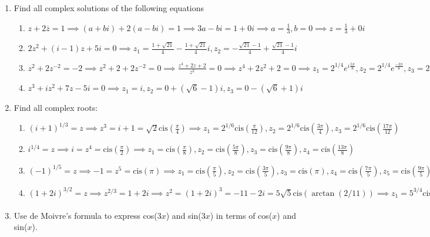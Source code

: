 \documentclass{article}
\begin{document}
\begin{enumerate}
	\item Find all complex solutions of the following equations	
	\begin{enumerate}
		\item $z + 2\overline{z} = 1 \implies (a + bi) + 2(a - bi) = 1 \implies 3a - bi = 1 + 0i \implies a=\frac{1}{3}, b = 0 \implies z = \frac{1}{3} + 0i$
		\item $2z^2 + (i-1)z+5i=0 \implies z_1 = \frac{1+\sqrt{21}}{4}-\frac{1+\sqrt{21}}{4}i, z_2 = -\frac{\sqrt{21}-1}{4}+\frac{\sqrt{21}-1}{4}i$
		\item $z^2+2z^{-2}=-2 \implies z^2 +2+2z^{-2}=0\implies \frac{z^4+2z+2}{z^2}=0 \implies z^4+2z^2+2=0 \implies z_1 = 2^{1/4}e^{i\frac{5\pi}{8}}, z_2 = 2^{1/4}e^{\frac{-3\pi}{8}}, z_3=2^{1/4}e^{\frac{-5\pi}{8}}, z_4=2^{1/4}e^{\frac{3\pi}{8}}$
		\item $z^3+iz^2+7z-5i=0 \implies z_1 = i, z_2 = 0 + (\sqrt{6}-1)i, z_3 = 0-(\sqrt{6}+1)i$
	\end{enumerate}
	
	\item Find all complex roots:
	\begin{enumerate}
		\item $(i + 1)^{1/3} = z \implies z^3 = i  + 1 = \sqrt{2}\text{cis}(\frac{\pi}{4}) \implies z_1 = 2^{1/6}\text{cis}(\frac{\pi}{12}),z_2 = 2^{1/6}\text{cis}(\frac{3\pi}{4}), z_3 = 2^{1/6}\text{cis}(\frac{17\pi}{12})$
		\item $i^{1/4} = z \implies i = z^4 = \text{cis}(\frac{\pi}{2}) \implies z_1 = \text{cis}(\frac{\pi}{8}), z_2 = \text{cis}(\frac{5\pi}{8}), z_3 = \text{cis}(\frac{9\pi}{8}), z_4 = \text{cis}(\frac{13\pi}{8}) $
		
		\item $(-1)^{1/5} = z \implies -1 = z^5 = \text{cis}(\pi) \implies z_1 = \text{cis}(\frac{\pi}{5}), z_2 = \text{cis}(\frac{3\pi}{5}),z_3 = \text{cis}(\pi),z_4 = \text{cis}(\frac{7\pi}{5}),z_5 = \text{cis}(\frac{9\pi}{5})$
		
		\item $(1 + 2i)^{3/2} = z \implies z^{2/3}=1+2i \implies z^2 = (1+2i)^3=-11-2i =5\sqrt{5}\text{cis}(\arctan(2/11)) \implies z_1 = 5^{3/4}\text{cis}(\frac{\arctan{\frac{2}{11}}}{2}), z_1 = 5^{3/4}\text{cis}(\frac{\arctan{\frac{2}{11}}}{2}) $
	\end{enumerate}
	
	\item Use de Moivre's formula to express cos(3$x$) and sin(3$x$) in terms of cos($x$) and sin($x$).
	

\end{enumerate}
\end{document}
